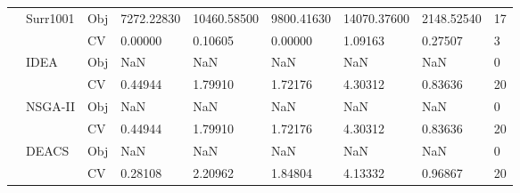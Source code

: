 \begin{table*}[!htb]
\begin{tabular}{lllllllll}
		& \multirow{2}{*}{Surr1001}          & Obj                                & 7272.22830                         & 10460.58500                        & 9800.41630                           & 14070.37600                         & 2148.52540                        & 17               \\
		&                                    & CV                                 & 0.00000                            & 0.10605                            & 0.00000                              & 1.09163                             & 0.27507                           & 3                \\
		& \multirow{2}{*}{IDEA}              & Obj                                & NaN                                & NaN                                & NaN                                  & NaN                                 & NaN                               & 0                \\
		&                                    & CV                                 & 0.44944                            & 1.79910                            & 1.72176                              & 4.30312                             & 0.83636                           & 20               \\
		& \multirow{2}{*}{NSGA-II}           & Obj                                & NaN                                & NaN                                & NaN                                  & NaN                                 & NaN                               & 0                \\
		&                                    & CV                                 & 0.44944                            & 1.79910                            & 1.72176                              & 4.30312                             & 0.83636                           & 20               \\
		& \multirow{2}{*}{DEACS}             & Obj                                & NaN                                & NaN                                & NaN                                  & NaN                                 & NaN                               & 0                \\
		&                                    & CV                                 & 0.28108                            & 2.20962                            & 1.84804                              & 4.13332                             & 0.96867                           & 20               \\

\end{tabular}
\end{table*}
